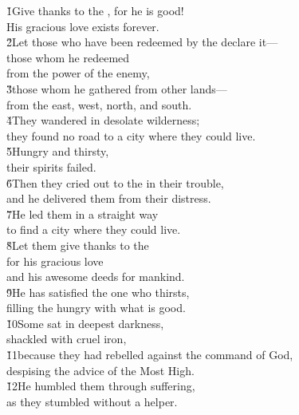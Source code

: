 \begin{poetry}
\poeml \v{1}Give thanks to the , for he is good! \\
\poemll    His gracious love exists forever. \\
\poeml \v{2}Let those who have been redeemed by the  declare it--- \\
\poemll    those whom he redeemed \\
\poemlll       from the power of the enemy, \\
\poeml \v{3}those whom he gathered from other lands--- \\
\poemll    from the east, west, north, and south. \\
\poeml \v{4}They wandered in desolate wilderness; \\
\poemll    they found no road to a city where they could live. \\
\poeml \v{5}Hungry and thirsty, \\
\poemll    their spirits failed. \\
\poeml \v{6}Then they cried out to the  in their trouble, \\
\poemll    and he delivered them from their distress. \\
\poeml \v{7}He led them in a straight way \\
\poemll    to find a city where they could live. \\
\poeml \v{8}Let them give thanks to the  \\
\poemll    for his gracious love \\
\poemlll       and his awesome deeds for mankind. \\
\poeml \v{9}He has satisfied the one who thirsts, \\
\poemll    filling the hungry with what is good. \\
\poeml \v{10}Some sat in deepest darkness, \\
\poemll    shackled with cruel iron, \\
\poeml \v{11}because they had rebelled against the command of God, \\
\poemll    despising the advice of the Most High. \\
\poeml \v{12}He humbled them through suffering, \\
\poemll    as they stumbled without a helper. \\

\end{poetry}
